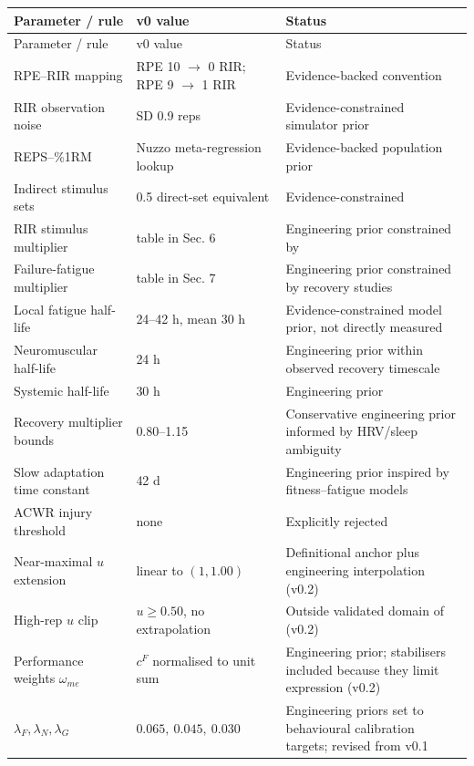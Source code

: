 \documentclass[11pt]{article}
\begin{document}
\begin{longtable}{p{}p{}p{}}
\toprule
Parameter / rule & v0 value & Status \\
\midrule
\endfirsthead
\toprule
Parameter / rule & v0 value & Status \\
\midrule
\endhead
RPE--RIR mapping & RPE 10 $\to$ 0 RIR; RPE 9 $\to$ 1 RIR & Evidence-backed convention \cite{zourdos2016} \\
RIR observation noise & SD 0.9 reps & Evidence-constrained simulator prior \cite{refalo2024} \\
REPS--\%1RM & Nuzzo meta-regression lookup & Evidence-backed population prior \cite{nuzzo2024} \\
Indirect stimulus sets & 0.5 direct-set equivalent & Evidence-constrained \cite{pelland2026} \\
RIR stimulus multiplier & table in Sec. 6 & Engineering prior constrained by \cite{robinson2024} \\
Failure-fatigue multiplier & table in Sec. 7 & Engineering prior constrained by recovery studies \cite{moran2017} \\
Local fatigue half-life & 24--42 h, mean 30 h & Evidence-constrained model prior, not directly measured \cite{moran2017,thomas2018} \\
Neuromuscular half-life & 24 h & Engineering prior within observed recovery timescale \cite{thomas2018} \\
Systemic half-life & 30 h & Engineering prior \\
Recovery multiplier bounds & 0.80--1.15 & Conservative engineering prior informed by HRV/sleep ambiguity \cite{bellenger2016,craven2022} \\
Slow adaptation time constant & 42 d & Engineering prior inspired by fitness--fatigue models \cite{imbach2022} \\
ACWR injury threshold & none & Explicitly rejected \cite{impellizzeri2020} \\
Near-maximal $u$ extension & linear to $(1,1.00)$ & Definitional anchor plus engineering interpolation (v0.2) \\
High-rep $u$ clip & $u\ge0.50$, no extrapolation & Outside validated domain of \cite{nuzzo2024} (v0.2) \\
Performance weights $\omega_{me}$ & $c^F$ normalised to unit sum & Engineering prior; stabilisers included because they limit expression (v0.2) \\
$\lambda_F,\lambda_N,\lambda_G$ & $0.065,\ 0.045,\ 0.030$ & Engineering priors set to behavioural calibration targets; revised from v0.1 \\

\end{longtable}
\end{document}
